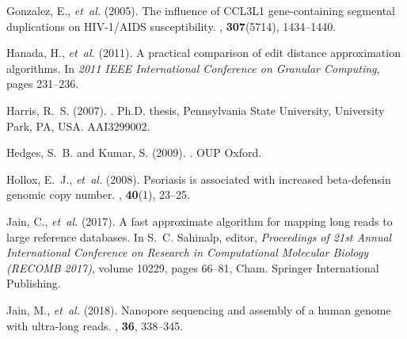 \documentclass{article}
\begin{document}
\begin{thebibliography}{}
Gonzalez, E., {\em et~al.} (2005).
\newblock The influence of {CCL3L1} gene-containing segmental duplications on
  {HIV-1/AIDS} susceptibility.
, {\bf 307}(5714), 1434--1440.

Hanada, H., {\em et~al.} (2011).
\newblock A practical comparison of edit distance approximation algorithms.
\newblock In {\em 2011 IEEE International Conference on Granular Computing\/},
  pages 231--236.

Harris, R.~S. (2007).
.
\newblock Ph.D. thesis, Pennsylvania State University, University Park, PA,
  USA.
\newblock AAI3299002.

Hedges, S.~B. and Kumar, S. (2009).
.
\newblock OUP Oxford.

Hollox, E.~J., {\em et~al.} (2008).
\newblock Psoriasis is associated with increased beta-defensin genomic copy
  number.
, {\bf 40}(1), 23--25.

Jain, C., {\em et~al.} (2017).
\newblock A fast approximate algorithm for mapping long reads to large
  reference databases.
\newblock In S.~C. Sahinalp, editor, {\em Proceedings of 21st Annual
  International Conference on Research in Computational Molecular Biology
  (RECOMB 2017)\/}, volume 10229, pages 66--81, Cham. Springer International
  Publishing.

Jain, M., {\em et~al.} (2018).
\newblock Nanopore sequencing and assembly of a human genome with ultra-long
  reads.
, {\bf 36}, 338--345.


\end{thebibliography}
\end{document}
